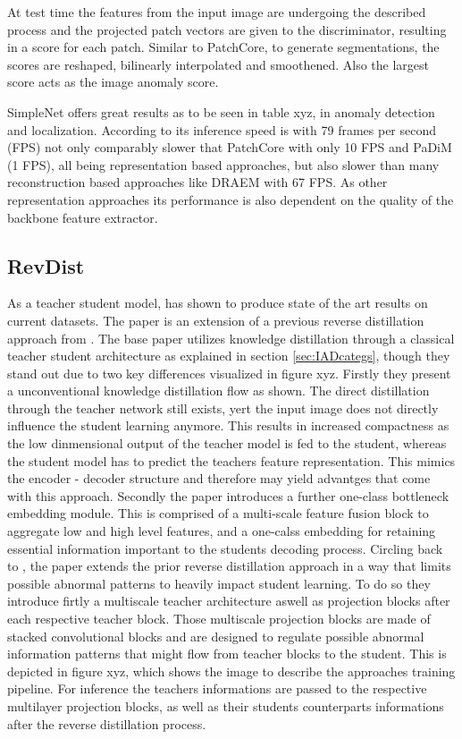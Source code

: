 At test time the features from the input image are undergoing the described process and the projected patch vectors are given to the discriminator, resulting in a score for each patch. Similar to 
PatchCore, to generate segmentations, the scores are reshaped, bilinearly interpolated and smoothened. Also the largest score acts as the image anomaly score.

SimpleNet offers great results as to be seen in table xyz, in anomaly detection and localization. According to \cite{liu2023simplenet} its inference speed is with 79 frames per second (FPS) 
not only comparably slower that PatchCore \cite{patchCore2022} with only 10 FPS 
and PaDiM \cite{Defard_2021PADIM} (1 FPS), all being representation based approaches, but also slower than many reconstruction based approaches like DRAEM with 67 FPS. As other representation 
approaches its performance is also dependent on the quality of the backbone feature extractor.


\subsection{RevDist}
\label{subsec:revdist}

As a teacher student model, \cite{revdist2023} has shown to produce state of the art results on current datasets. The paper is an extension of a previous reverse distillation approach from 
\cite{Deng_2022basicrevdist}. The base paper utilizes knowledge distillation through a classical teacher student architecture as explained in section \ref{sec:IADcategs}, though they stand out 
due to two key differences visualized in figure xyz. Firstly they present a unconventional knowledge distillation flow as shown. The direct distillation through the teacher network still exists, 
yert the input image does not directly influence the student learning anymore. This results in increased compactness as the low dinmensional output of the teacher model is fed to the student, 
whereas the student model has to predict the teachers feature representation. This mimics the encoder - decoder structure and therefore may yield advantges that come with this approach. Secondly 
the paper introduces a further one-class bottleneck embedding module. This is comprised of a multi-scale feature fusion block to aggregate low and high level features, and a one-calss embedding 
for retaining essential information important to the students decoding process. \newline
Circling back to \cite{revdist2023}, the paper extends the prior reverse distillation approach in a way that limits possible abnormal patterns to heavily impact student learning. To do so they 
introduce firtly a multiscale teacher architecture aswell as projection blocks after each respective teacher block. Those multiscale projection blocks are made of stacked convolutional blocks 
and are designed to regulate possible abnormal information patterns that might flow from teacher blocks to the student. This is depicted in figure xyz, which shows the image to describe the 
approaches training pipeline. For inference the teachers informations are passed to the respective multilayer projection blocks, as well as their students counterparts informations after the 
reverse distillation process.

